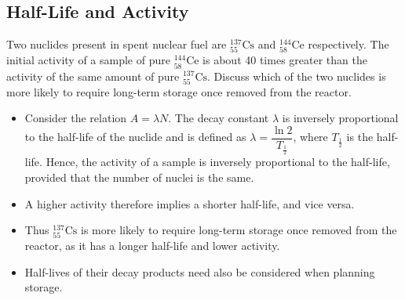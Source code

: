 \documentclass[a4paper,12pt]{article}
\newcommand{\atom}[3]{{}^{#1}_{#2}\text{#3}}
\begin{document}
\pagebreak

\subsection{Half-Life and Activity}

Two nuclides present in spent nuclear fuel are $\atom{137}{55}{Cs}$ and $\atom{144}{58}{Ce}$ respectively. The initial activity of a sample of pure $\atom{144}{58}{Ce}$ is about 40 times greater than the activity of the same amount of pure $\atom{137}{55}{Cs}$. Discuss which of the two nuclides is more likely to require long-term storage once removed from the reactor.
\begin{itemize}
  \item Consider the relation $A = \lambda N$. The decay constant $\lambda$ is inversely proportional to the half-life of the nuclide and is defined as $\lambda = \dfrac{\ln 2}{T_{\frac{1}{2}}}$, where $T_{\frac{1}{2}}$ is the half-life. Hence, the activity of a sample is inversely proportional to the half-life, provided that the number of nuclei is the same.
  \item A higher activity therefore implies a shorter half-life, and vice versa.
  \item Thus $\atom{137}{55}{Cs}$ is more likely to require long-term storage once removed from the reactor, as it has a longer half-life and lower activity.
  \item Half-lives of their decay products need also be considered when planning storage.
\end{itemize}
\end{document}
